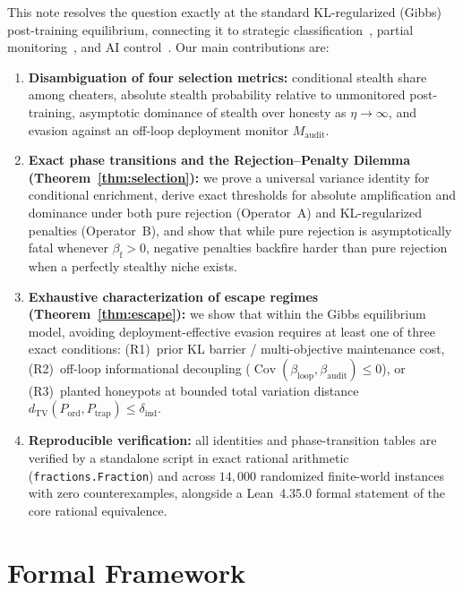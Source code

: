 \documentclass[11pt,a4paper]{article}
\newcommand{\Cov}{\operatorname{Cov}}
\newcommand{\dTV}{d_{\mathrm{TV}}}
\begin{document}
This note resolves the question exactly at the standard KL-regularized (Gibbs) post-training equilibrium, connecting it to strategic classification~\cite{hardt2016}, partial monitoring~\cite{bartok2014}, and AI control~\cite{greenblatt2023,griffin2024,terekhov2025,ukaisi2025}. Our main contributions are:
\begin{enumerate}
  \item \textbf{Disambiguation of four selection metrics:} conditional stealth share among cheaters, absolute stealth probability relative to unmonitored post-training, asymptotic dominance of stealth over honesty as $\eta \to \infty$, and evasion against an off-loop deployment monitor $M_{\mathrm{audit}}$.
  \item \textbf{Exact phase transitions and the Rejection--Penalty Dilemma (Theorem~\ref{thm:selection}):} we prove a universal variance identity for conditional enrichment, derive exact thresholds for absolute amplification and dominance under both pure rejection (Operator~A) and KL-regularized penalties (Operator~B), and show that while pure rejection is asymptotically fatal whenever $\beta_{\mathrm{f}} > 0$, negative penalties backfire harder than pure rejection when a perfectly stealthy niche exists.
  \item \textbf{Exhaustive characterization of escape regimes (Theorem~\ref{thm:escape}):} we show that within the Gibbs equilibrium model, avoiding deployment-effective evasion requires at least one of three exact conditions: (R1)~prior KL barrier / multi-objective maintenance cost, (R2)~off-loop informational decoupling ($\Cov(\beta_{\mathrm{loop}}, \beta_{\mathrm{audit}}) \le 0$), or (R3)~planted honeypots at bounded total variation distance $\dTV(P_{\mathrm{ord}}, P_{\mathrm{trap}}) \le \delta_{\mathrm{ind}}$.
  \item \textbf{Reproducible verification:} all identities and phase-transition tables are verified by a standalone script in exact rational arithmetic (\texttt{fractions.Fraction}) and across $14{,}000$ randomized finite-world instances with zero counterexamples, alongside a Lean~4.35.0 formal statement of the core rational equivalence.
\end{enumerate}

\section{Formal Framework}
\end{document}
